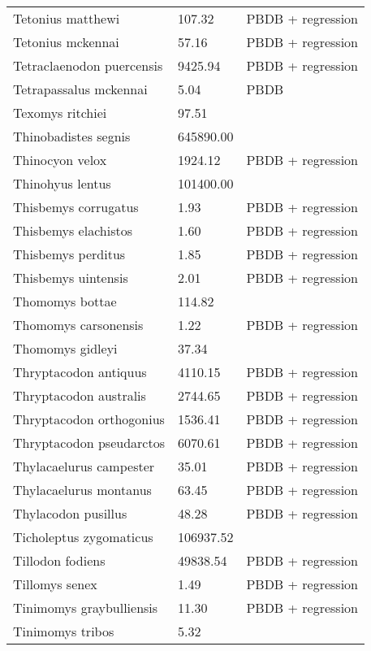 \documentclass{article}
\begin{document}
\begin{center}
\begin{longtable}{p{} p{} p{}}
    Tetonius matthewi & 107.32 & PBDB + regression \\ 
    Tetonius mckennai & 57.16 & PBDB + regression \\ 
    Tetraclaenodon puercensis & 9425.94 & PBDB + regression \\ 
    Tetrapassalus mckennai & 5.04 & PBDB \\ 
    Texomys ritchiei & 97.51 & \cite{Tomiya2013} \\ 
    Thinobadistes segnis & 645890.00 & \cite{McDonald2005} \\ 
    Thinocyon velox & 1924.12 & PBDB + regression \\ 
    Thinohyus lentus & 101400.00 & \cite{McKenna2011} \\ 
    Thisbemys corrugatus & 1.93 & PBDB + regression \\ 
    Thisbemys elachistos & 1.60 & PBDB + regression \\ 
    Thisbemys perditus & 1.85 & PBDB + regression \\ 
    Thisbemys uintensis & 2.01 & PBDB + regression \\ 
    Thomomys bottae & 114.82 & \cite{Smith2004} \\ 
    Thomomys carsonensis & 1.22 & PBDB + regression \\ 
    Thomomys gidleyi & 37.34 & \cite{Tomiya2013} \\ 
    Thryptacodon antiquus & 4110.15 & PBDB + regression \\ 
    Thryptacodon australis & 2744.65 & PBDB + regression \\ 
    Thryptacodon orthogonius & 1536.41 & PBDB + regression \\ 
    Thryptacodon pseudarctos & 6070.61 & PBDB + regression \\ 
    Thylacaelurus campester & 35.01 & PBDB + regression \\ 
    Thylacaelurus montanus & 63.45 & PBDB + regression \\ 
    Thylacodon pusillus & 48.28 & PBDB + regression \\ 
    Ticholeptus zygomaticus & 106937.52 & \cite{Tomiya2013} \\ 
    Tillodon fodiens & 49838.54 & PBDB + regression \\ 
    Tillomys senex & 1.49 & PBDB + regression \\ 
    Tinimomys graybulliensis & 11.30 & PBDB + regression \\ 
    Tinimomys tribos & 5.32 & \cite{Skinner1972} \\ 

\end{longtable}
\end{center}
\end{document}
